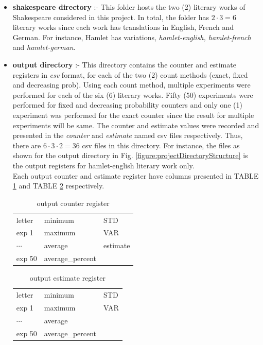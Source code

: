 \documentclass[longpaper, english, final, times]{revdetua}
\begin{document}
		\begin{itemize}
			\setlength\itemsep{1em}
			\item \textbf{shakespeare directory} :- This folder hosts the two (2) literary works of Shakespeare considered in this project. In total, the folder has $2\cdot 3=6$ literary works since each work has translations in English, French and German. For instance, Hamlet has variations, \textit{hamlet-english, hamlet-french} and \textit{hamlet-german}.
			
			\item \textbf{output directory} :- This directory contains the counter and estimate registers in \textit{csv} format, for each of the two (2) count methods (exact, fixed and decreasing prob). Using each count method, multiple experiments were performed for each of the six (6) literary works. Fifty (50) experiments were performed for fixed and decreasing probability counters and only one (1) experiment was performed for the exact counter since the result for multiple experiments will be same. The counter and estimate values were recorded and presented in the \textit{counter} and \textit{estimate} named csv files respectively. Thus, there are $6\cdot 3\cdot 2=36$ csv files in this directory. For instance, the files as shown for the output directory in Fig. \ref{figure:projectDirectoryStructure} is the output registers for hamlet-english literary work only.\\
			
			Each output counter and estimate register have columns presented in TABLE \ref{table:outputCounterRegister} and TABLE \ref{table:outputEstimateRegister} respectively. 
			\begin{table}[!ht]
				\caption{output counter register}
				\begin{center}
					\begin{tabular}{l|l|l}
						letter&minimum&STD\\
						exp 1&maximum&VAR\\
						$\cdots$&average&estimate\\
						exp 50&average\_percent&
					\end{tabular}
				\end{center}
				\label{table:outputCounterRegister}
			\end{table}
			\begin{table}[!ht]
				\caption{output estimate register}
				\begin{center}
					\begin{tabular}{l|l|l}
						letter&minimum&STD\\
						exp 1&maximum&VAR\\
						$\cdots$&average&\\
						exp 50&average\_percent&
					\end{tabular}
				\end{center}
				\label{table:outputEstimateRegister}
			\end{table}
			

\end{itemize}
\end{document}
